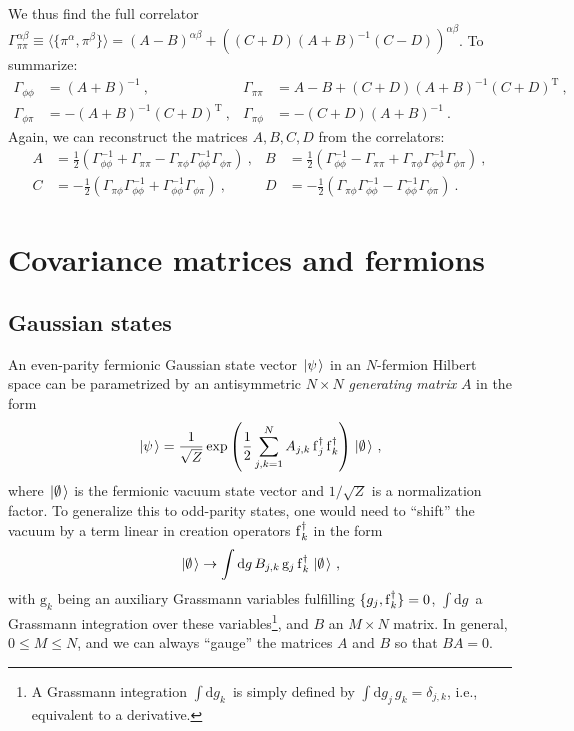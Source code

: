 \documentclass[letter]{article}
\newcommand{\intd}[1]{\int\mathrm{d}#1\,}
\begin{document}
We thus find the full correlator $\Gamma^{\alpha\beta}_{\pi\pi} \equiv \langle \{ \pi^\alpha, \pi^\beta \} \rangle = (A - B)^{\alpha\beta} + ( (C+D)(A+B)^{-1}(C-D))^{\alpha\beta}$. To summarize:
\begin{align}
\Gamma_{\phi\phi} &= (A+B)^{-1}\ , & \Gamma_{\pi\pi} &= A-B + (C+D) (A+B)^{-1} (C+D)^\mathrm{T}\ , \nonumber\\
\Gamma_{\phi\pi} &= -(A+B)^{-1} (C+D)^\mathrm{T}\ , & \Gamma_{\pi\phi} &= - (C+D) (A+B)^{-1}\ .
\end{align}
Again, we can reconstruct the matrices $A,B,C,D$ from the correlators:
\begin{align}
A &= \frac{1}{2} \left( \Gamma_{\phi\phi}^{-1} + \Gamma_{\pi\pi} - \Gamma_{\pi\phi} \Gamma_{\phi\phi}^{-1} \Gamma_{\phi\pi} \right)\ , &
B &= \frac{1}{2} \left(  \Gamma_{\phi\phi}^{-1} - \Gamma_{\pi\pi} + \Gamma_{\pi\phi} \Gamma_{\phi\phi}^{-1} \Gamma_{\phi\pi}  \right)\ ,\nonumber\\
C &= -\frac{1}{2} \left( \Gamma_{\pi\phi} \Gamma_{\phi\phi}^{-1} + \Gamma_{\phi\phi}^{-1} \Gamma_{\phi\pi} \right)\ , &
D &=  -\frac{1}{2} \left( \Gamma_{\pi\phi} \Gamma_{\phi\phi}^{-1} - \Gamma_{\phi\phi}^{-1} \Gamma_{\phi\pi} \right)\ .
\end{align}

\section{Covariance matrices and fermions}
\subsection{Gaussian states}
An even-parity fermionic Gaussian state vector $\left.\left|{\psi}\right.\right\rangle$ in an $N$-fermion Hilbert space can be parametrized by an antisymmetric $N \times N$ \emph{generating matrix} $A$ in the form
\begin{equation}
\label{EQ_FERM_GAUSS_DEF}
\left.\left|{\psi}\right.\right\rangle = \frac{1}{\sqrt{Z}} \exp\left( \frac{1}{2} \sum_{j,k=1}^N A_{j,k} \operatorname{f}^\dagger_j \operatorname{f}^\dagger_k \right) {\left.\left|{\emptyset}\right.\right\rangle} \ ,
\end{equation}
where ${\left.\left|{\emptyset}\right.\right\rangle}$ is the fermionic vacuum state vector and $1/\sqrt{Z}$ is a normalization factor. To generalize this to odd-parity states, one would need to ``shift'' the vacuum by a term linear in creation operators $\operatorname{f}^\dagger_k$ in the form
\begin{equation}
\vacket \to \intd g B_{j,k}\, \mathrm{g}_j \fd_k \vacket \ ,
\end{equation}
with $\mathrm{g}_k$ being an auxiliary Grassmann variables fulfilling $\{ g_j, \operatorname{f}^\dagger_k \} = 0$, $\intd g$ a Grassmann integration over these variables\footnote{A Grassmann integration $\intd{g_k}$ is simply defined by $\intd{g_j} g_k = \delta_{j,k}$, i.e., equivalent to a derivative.}, and $B$ an $M \times N$ matrix. In general, $0 \leq M \leq N$, and we can always ``gauge'' the matrices $A$ and $B$ so that $B A = 0$.
\end{document}
